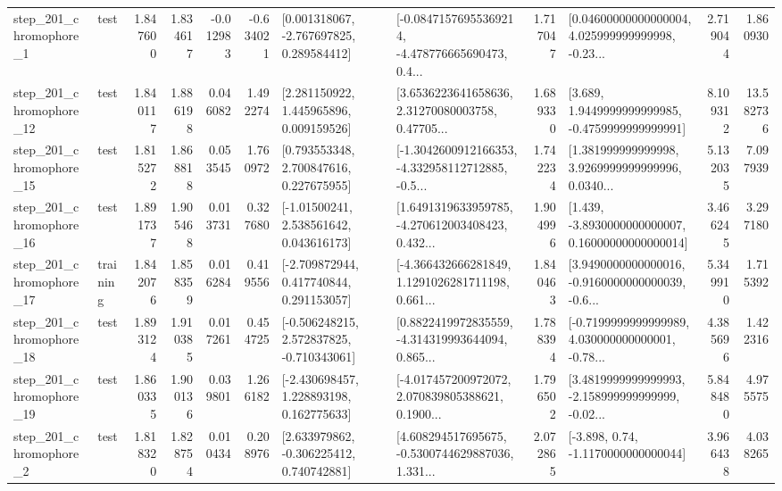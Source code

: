 \begin{tabular}{llrrrrllrlrr}
   step\_201\_chromophore\_1 &      test &      1.847600 &    1.834617 &     -0.012983 & -0.634021 &    [0.001318067, -2.767697825, 0.289584412] &  [-0.08471576955369214, -4.478776665690473, 0.4... &       1.717047 &  [0.04600000000000004, 4.025999999999998, -0.23... &            2.719044 &          1.860930 \\
  step\_201\_chromophore\_12 &      test &      1.840117 &    1.886198 &      0.046082 &  1.492274 &     [2.281150922, 1.445965896, 0.009159526] &  [3.6536223641658636, 2.31270080003758, 0.47705... &       1.689330 &   [3.689, 1.9449999999999985, -0.4759999999999991] &            8.109312 &         13.582736 \\
  step\_201\_chromophore\_15 &      test &      1.815272 &    1.868818 &      0.053545 &  1.760972 &     [0.793553348, 2.700847616, 0.227675955] &  [-1.3042600912166353, -4.332958112712885, -0.5... &       1.742234 &  [1.381999999999998, 3.9269999999999996, 0.0340... &            5.132035 &          7.097939 \\
  step\_201\_chromophore\_16 &      test &      1.891737 &    1.905468 &      0.013731 &  0.327680 &     [-1.01500241, 2.538561642, 0.043616173] &  [1.6491319633959785, -4.270612003408423, 0.432... &       1.904996 &  [1.439, -3.8930000000000007, 0.16000000000000014] &            3.466245 &          3.297180 \\
  step\_201\_chromophore\_17 &  training &      1.842076 &    1.858359 &      0.016284 &  0.419556 &    [-2.709872944, 0.417740844, 0.291153057] &  [-4.366432666281849, 1.1291026281711198, 0.661... &       1.840463 &  [3.9490000000000016, -0.9160000000000039, -0.6... &            5.349910 &          1.715392 \\
  step\_201\_chromophore\_18 &      test &      1.893124 &    1.910385 &      0.017261 &  0.454725 &   [-0.506248215, 2.572837825, -0.710343061] &  [0.8822419972835559, -4.314319993644094, 0.865... &       1.788394 &  [-0.7199999999999989, 4.030000000000001, -0.78... &            4.385696 &          1.422316 \\
  step\_201\_chromophore\_19 &      test &      1.860335 &    1.900136 &      0.039801 &  1.266182 &    [-2.430698457, 1.228893198, 0.162775633] &  [-4.017457200972072, 2.070839805388621, 0.1900... &       1.796502 &  [3.4819999999999993, -2.158999999999999, -0.02... &            5.848480 &          4.975575 \\
   step\_201\_chromophore\_2 &      test &      1.818320 &    1.828754 &      0.010434 &  0.208976 &    [2.633979862, -0.306225412, 0.740742881] &  [4.608294517695675, -0.5300744629887036, 1.331... &       2.072865 &                [-3.898, 0.74, -1.1170000000000044] &            3.966438 &          4.038265 \\

\end{tabular}
